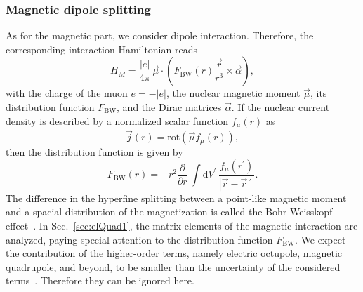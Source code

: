 \subsubsection{Magnetic dipole splitting}
\label{sec:magndip}
As for the magnetic part, we consider dipole interaction. Therefore, the corresponding interaction Hamiltonian reads~\cite{Elizarov2005}
\begin{equation}
\label{eq:Hmag}
H_{M} = \frac{|e|}{4 \pi}\,\vec{\mu}\cdot \left( F_{\text{BW}}(r) \frac{\vec{r}}{r^3} \times \vec{\alpha} \right),
\end{equation}
with the charge of the muon $e=-|e|$, the nuclear magnetic moment $\vec{\mu}$, its distribution function $F_{\text{BW}}$, and the Dirac matrices $\vec{\alpha}$. If the nuclear current density is described by a normalized scalar function $f_\mu(r)$ as
\begin{equation}
\label{eq:currentdistr}
\vec{j}(r)= \text{rot}\left(\vec{\mu}f_\mu(r)\right),
\end{equation}
then the distribution function is given by
\begin{equation}
\label{eq:Fbw}
F_{\text{BW}}(r)=-r^2 \frac{\partial}{\partial r}\,\int \text{d}V^{\prime}\,\frac{f_\mu(r^{\prime})}{|\vec{r}-\vec{r}\,^{\prime}|}.
\end{equation}
The difference in the hyperfine splitting between a point-like magnetic moment and a spacial distribution of the magnetization is called the Bohr-Weisskopf effect~\cite{bohrWeisskopf1950}. In Sec.~\ref{sec:elQuad1}, the matrix elements of the magnetic interaction are analyzed, paying special attention to the distribution function $F_{\text{BW}}$. We expect the contribution of the higher-order terms, namely electric octupole, magnetic quadrupole, and beyond, to be smaller than the uncertainty of the considered terms~\cite{Devons1995,Steffen1985}. Therefore they can be ignored here.

